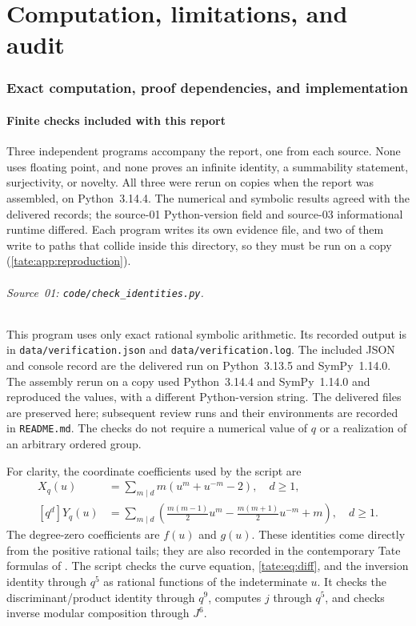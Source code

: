 \documentclass[11pt,letterpaper]{article}
\theoremstyle{definition}
\newcommand{\file}[1]{\nolinkurl{#1}}
\begin{document}
\part{Computation, limitations, and audit}\label{tate:part:computation}

\section{Exact computation, proof dependencies, and implementation}
\label{tate:sec:computation}

\subsection{Finite checks included with this report}

Three independent programs accompany the report, one from each source.
None uses floating point, and none proves an infinite identity, a
summability statement, surjectivity, or novelty. All three were rerun on
copies when the report was assembled, on Python~3.14.4. The numerical
and symbolic results agreed with the delivered records; the source-01
Python-version field and source-03 informational runtime differed. Each program writes its own evidence file, and two of them write to
paths that collide inside this directory, so they must be run on a copy
(\cref{tate:app:reproduction}).

\paragraph{Source~01: \texttt{code/check\_identities.py}.}
This program uses only
exact rational symbolic arithmetic. Its recorded output is in
\file{data/verification.json} and \file{data/verification.log}.
The included JSON and console record are the delivered run on
Python~3.13.5 and SymPy~1.14.0. The assembly rerun on a copy used
Python~3.14.4 and SymPy~1.14.0 and reproduced the values, with a
different Python-version string. The delivered files are preserved here;
subsequent review runs and their environments are recorded in
\file{README.md}.
The checks do not require a numerical value of $q$ or a realization of
an arbitrary ordered group.

For clarity, the coordinate coefficients used by the script are
\begin{align}
 [q^d]X_q(u)&=\sum_{m\mid d}m(u^m+u^{-m}-2),\quad d\ge1,
 \label{tate:eq:Xcoeff}\\
 [q^d]Y_q(u)&=\sum_{m\mid d}
 \left(\frac{m(m-1)}2u^m-\frac{m(m+1)}2u^{-m}+m\right),\quad d\ge1.
 \label{tate:eq:Ycoeff}
\end{align}
The degree-zero coefficients are $f(u)$ and $g(u)$. These identities
come directly from the positive rational tails; they are also recorded
in the contemporary Tate formulas of \cite{EV}. The script checks the
curve equation, \eqref{tate:eq:diff}, and the inversion identity through
$q^5$ as rational functions of the indeterminate $u$. It checks the
discriminant/product identity through $q^9$, computes $j$ through $q^5$,
and checks inverse modular composition through $J^6$.
\end{document}

